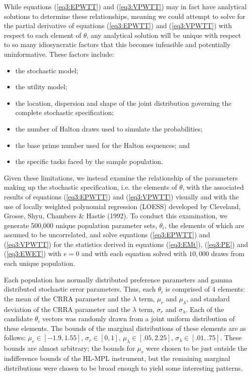 \documentclass[../main.tex]{subfiles}
\begin{document}
While equations (\ref{eq3:EPWTT}) and (\ref{eq3:VPWTT}) may in fact have analytical solutions to determine these relationships, meaning we could attempt to solve for the partial derivative of equations (\ref{eq3:EPWTT}) and (\ref{eq3:VPWTT}) with respect to each element of $\theta$, any analytical solution will be unique with respect to so many idiosyncratic factors that this becomes infeasible and potentially uninformative.
These factors include:
\begin{itemize}
 \setlength\itemsep{-.25em}
	\item the stochastic model;
	\item the utility model;
	\item the location, dispersion and shape of the joint distribution governing the complete stochastic specification;
	\item the number of Halton draws used to simulate the probabilities;
	\item the base prime number used for the Halton sequences; and
	\item the specific tasks faced by the sample population.
\end{itemize}
\noindent Given these limitations, we instead examine the relationship of the parameters making up the stochastic specification, i.e. the elements of $\theta$, with the associated results of equations (\ref{eq3:EPWTT}) and (\ref{eq3:VPWTT}) visually and with the use of locally weighted polynomial regression (LOESS) developed by Cleveland, Grosse, Shyu, Chambers \& Hastie (1992).
To conduct this examination, we generate 500,000 unique population parameter sets, $\theta_i$, the elements of which are assumed to be uncorrelated, and solve equations (\ref{eq3:EPWTT}) and (\ref{eq3:VPWTT}) for the statistics derived in equations (\ref{eq3:EMt}), (\ref{eq3:PE}) and (\ref{eq3:EWET}) with $e=0$ and with each equation solved with $10,000$ draws from each unique population.

Each population has normally distributed preference parameters and gamma distributed stochastic error parameters.
Thus, each $\theta_i$ is comprised of 4 elements: the mean of the CRRA parameter and the $\lambda$ term, $\mu_r$ and $\mu_\lambda$, and standard deviation of the CRRA parameter and the $\lambda$ term, $\sigma_r$ and $\sigma_\lambda$. Each of the candidate $\theta_i$ vectors was randomly drawn from a joint uniform distribution of these elements.
The bounds of the marginal distributions of these elements are as follows: $\mu_r \in [-1.9 , 1.55 ]$, $\sigma_r \in [0 , 1]$, $\mu_\lambda \in [.05 , 2.25]$, $\sigma_\lambda \in [.01 , .75]$.
These bounds are almost arbitrary; the bounds for $\mu_r$ were chosen to be just outside the indifference bounds of the HL-MPL instrument, but the remaining marginal distributions were chosen to be broad enough to yield some interesting patterns.
\end{document}
